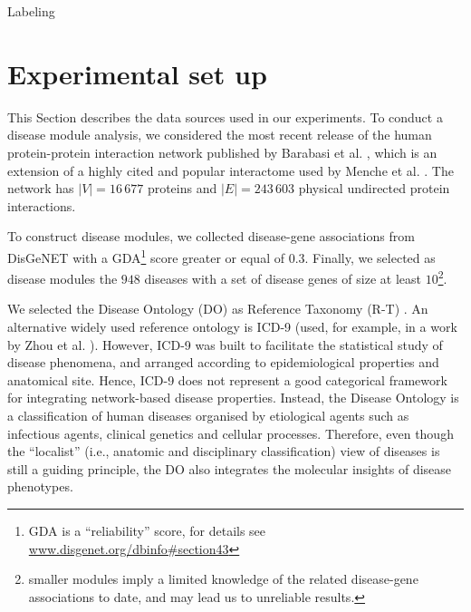 \documentclass[journal,twoside,web]{ieeecolor}
\begin{document}
\begin{algorithm}
\begin{footnotesize}
\SetAlgoLined

\end{footnotesize}
\label{algo:label}
\caption{Labeling}
\end{algorithm}


\vspace{-15pt}
\section{Experimental set up}
\label{data}
This Section describes the data  sources used in our experiments.
To conduct a disease module analysis, we considered the most recent  release of the human protein-protein interaction network published by Barabasi et al. \cite{cheng2019network}, which is an extension of a highly cited and popular interactome used by Menche et al. \cite{menche2015uncovering}. The  network has $|V| = 16\,677$ proteins and $|E| = 243\,603$ physical undirected protein interactions. 

To construct disease modules, we collected disease-gene associations from DisGeNET \cite{pinero2020disgenet} with a GDA\footnote{GDA is a ``reliability'' score, for details see \url{www.disgenet.org/dbinfo\#section43}} score greater or equal of 0.3. Finally, we selected as disease modules the $948$ diseases with a set of disease genes of size at least $10$\footnote{smaller modules imply a limited knowledge of the related disease-gene associations to date, and may lead us to unreliable results.}.





We selected the Disease Ontology (DO) as Reference Taxonomy (R-T) \cite{schriml2012disease}. An alternative widely used reference ontology is ICD-9 (used, for example, in a work by Zhou et al. \cite{zhou2018systems}). However,  ICD-9  was built to facilitate the statistical study of disease phenomena, and arranged according to epidemiological properties and anatomical site. 
Hence, ICD-9 does not represent a good categorical framework for integrating network-based disease properties. 
Instead, the Disease Ontology is a classification of human diseases organised by  etiological agents such as infectious agents, clinical genetics and cellular processes. Therefore, even though the “localist” (i.e., anatomic and disciplinary classification) view of diseases is still a guiding principle, the DO also integrates the molecular insights of disease phenotypes. 
\end{document}
